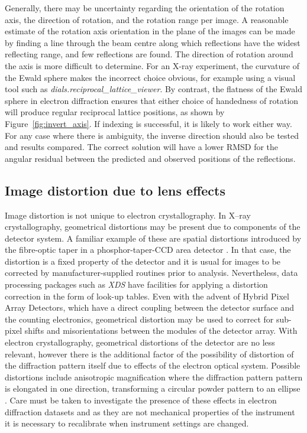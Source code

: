 \documentclass[preprint]{iucr}
\newcommand{\dialsreciprocallatticeviewer}{\emph{dials.reciprocal\_lattice\_viewer}\xspace}
\newcommand{\xds}{\emph{XDS}\xspace}
\begin{document}
Generally, there may be
uncertainty regarding the orientation of the rotation axis, the direction of
rotation, and the rotation range per image. A reasonable estimate of the
rotation axis orientation in the plane of the images can be made by finding a
line through the beam centre along which reflections have the widest reflecting
range, and few reflections are found. The direction of rotation around the axis
is more difficult to determine. For an X-ray experiment, the curvature of the
Ewald sphere makes the incorrect choice obvious, for example using a visual
tool such as \dialsreciprocallatticeviewer \cite{Winter2018}. By contrast, the
flatness of the Ewald sphere in electron diffraction ensures that either choice
of handedness of rotation will produce regular reciprocal lattice positions,
as shown by Figure~\ref{fig:invert_axis}. If indexing is successful, it is
likely to work either way. For any case where there is ambiguity, the inverse
direction should also be tested and results compared. The correct solution will
have a lower RMSD for the angular residual between the predicted and observed
positions of the reflections.

\subsection{Image distortion due to lens effects \label{sec:distortion}}

Image distortion is not unique to electron crystallography. In X--ray
crystallography, geometrical distortions may be present due to components
of the detector system. A familiar example of these are spatial distortions
introduced by the fibre-optic taper in a phosphor-taper-CCD area detector
\cite{Stanton1992}. In that case, the distortion is a fixed property of the
detector and it is usual for images to be corrected by manufacturer-supplied
routines prior to analysis. Nevertheless, data processing packages such as \xds
have facilities for applying a distortion correction in the form of look-up
tables. Even with the advent of Hybrid Pixel Array Detectors, which have a
direct coupling between the detector surface and the counting electronics,
geometrical distortion may be used to correct for sub-pixel shifts and
misorientations between the modules of the detector array. With electron
crystallography, geometrical distortions of the detector are no less relevant,
however there is the additional factor of the possibility of distortion of
the diffraction pattern itself due to effects of the electron optical system.
Possible distortions include
anisotropic magnification where the diffraction pattern pattern is elongated
in one direction, transforming a circular powder pattern to an ellipse
\cite{lenscorr_2dx:2006,Clabbers2017}. Care must be taken to investigate the
presence of these effects in electron diffraction datasets and as they are
not mechanical properties of the instrument it is necessary to recalibrate
when instrument settings are changed.
\end{document}
